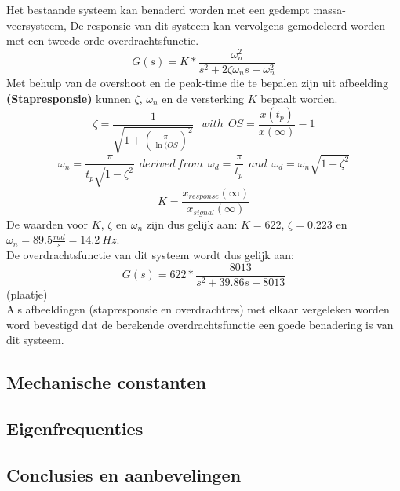 \documentclass[a4paper]{article}
\begin{document}
Het bestaande systeem kan benaderd worden met een gedempt massa-veersysteem, De responsie van dit systeem kan vervolgens gemodeleerd worden met een tweede orde overdrachtsfunctie. 
\begin{equation}
G(s) = K * \frac{\omega_n^2}{s^2 + 2 \zeta \omega_n s + \omega_n^2}
\end{equation}
Met behulp van de overshoot en de peak-time die te bepalen zijn uit afbeelding \textbf{(Stapresponsie)} kunnen $\zeta$, $\omega_n$ en de versterking $K$ bepaalt worden.
\begin{equation}
\zeta = \frac{1}{\sqrt{1 + (\frac{\pi}{\ln(OS})^2}} \ \ \ with \ \ OS = \frac{x(t_p)}{x(\infty)} -1
\end{equation}
\begin{equation}
\omega_n = \frac{\pi}{t_p \sqrt{1 - \zeta^2}} \ \ derived \ from \ \ \omega_d = \frac{\pi}{t_p} \ \ and \ \ \omega_d = \omega_n \sqrt{1-\zeta^2}
\end{equation}
\begin{equation}
K = \frac{x_{response}(\infty)}{x_{signal}(\infty)}
\end{equation}
De waarden voor $K$, $\zeta$ en $\omega_n$ zijn dus gelijk aan: $ K = 622$, 
$\zeta = 0.223$ en $\omega_n = 89.5 \frac{rad}{s} = 14.2 \ Hz$.\\
De overdrachtsfunctie van dit systeem wordt dus gelijk aan:
\begin{equation}
G(s) = 622 * \frac{8013}{s^2 + 39.86 s + 8013}
\end{equation}
(plaatje) \\
Als afbeeldingen (stapresponsie en overdrachtres) met elkaar vergeleken worden word bevestigd dat de berekende overdrachtsfunctie een goede benadering is van dit systeem. 

\subsection{Mechanische constanten}

\subsection{Eigenfrequenties}

\subsection{Conclusies en aanbevelingen}
\end{document}
